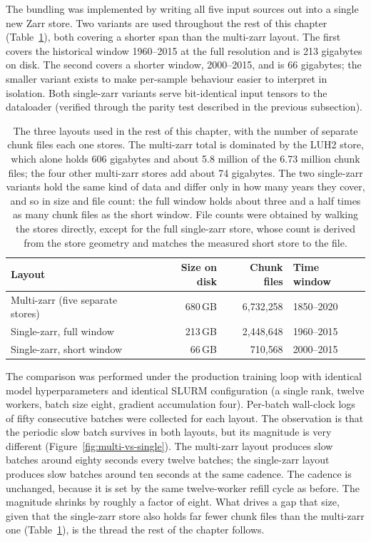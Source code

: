 \documentclass[12pt,a4paper]{article}
\begin{document}
The bundling was implemented by writing all five input sources out into a single new Zarr
store. Two variants are used throughout the rest of this chapter
(Table~\ref{tab:datasets}), both covering a shorter span than the multi-zarr layout. The first
covers the historical window 1960--2015 at the full resolution and is 213 gigabytes on disk.
The second covers a shorter window, 2000--2015, and is 66 gigabytes; the smaller variant
exists to make per-sample behaviour easier to interpret in isolation. Both single-zarr
variants serve bit-identical input tensors to the dataloader (verified through the parity
test described in the previous subsection).

\begin{table}[ht]
\centering
\small
\begin{tabular}{@{}lrrl@{}}
\toprule
\textbf{Layout} & \textbf{Size on disk} & \textbf{Chunk files} & \textbf{Time window} \\
\midrule
Multi-zarr (five separate stores) & 680\,GB & 6{,}732{,}258 & 1850--2020 \\
Single-zarr, full window          & 213\,GB & 2{,}448{,}648 & 1960--2015 \\
Single-zarr, short window         & 66\,GB  &   710{,}568   & 2000--2015 \\
\bottomrule
\end{tabular}
\caption{The three layouts used in the rest of this chapter, with the number of separate chunk
files each one stores. The multi-zarr total is dominated by the LUH2 store, which alone holds
606 gigabytes and about 5.8 million of the 6.73 million chunk files; the four other multi-zarr
stores add about 74 gigabytes. The two single-zarr variants hold the same kind of data and
differ only in how many years they cover, and so in size and file count: the full window holds
about three and a half times as many chunk files as the short window. File counts were obtained
by walking the stores directly, except for the full single-zarr store, whose count is derived from
the store geometry and matches the measured short store to the file.}
\label{tab:datasets}
\end{table}

The comparison was performed under the production training loop with identical model
hyperparameters and identical SLURM configuration (a single rank, twelve workers, batch
size eight, gradient accumulation four). Per-batch wall-clock logs of fifty consecutive
batches were collected for each layout. The observation is that the periodic slow batch
survives in both layouts, but its magnitude is very different
(Figure~\ref{fig:multi-vs-single}). The multi-zarr layout produces slow batches around
eighty seconds every twelve batches; the single-zarr layout produces slow batches around
ten seconds at the same cadence. The cadence is unchanged, because it is set by the same
twelve-worker refill cycle as before. The magnitude shrinks by roughly a factor of eight. What
drives a gap that size, given that the single-zarr store also holds far fewer chunk files than
the multi-zarr one (Table~\ref{tab:datasets}), is the thread the rest of the chapter follows.
\end{document}
